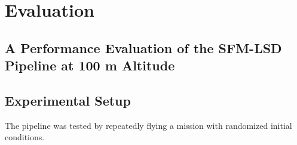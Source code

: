 \chapter{Evaluation}
\label{chapter:evaluation}

\section{A Performance Evaluation of the SFM-LSD Pipeline at 100 m Altitude}\label{sec:sfm_lsd_eval}
\section{Experimental Setup}

The pipeline was tested by repeatedly flying a mission with randomized initial conditions.

